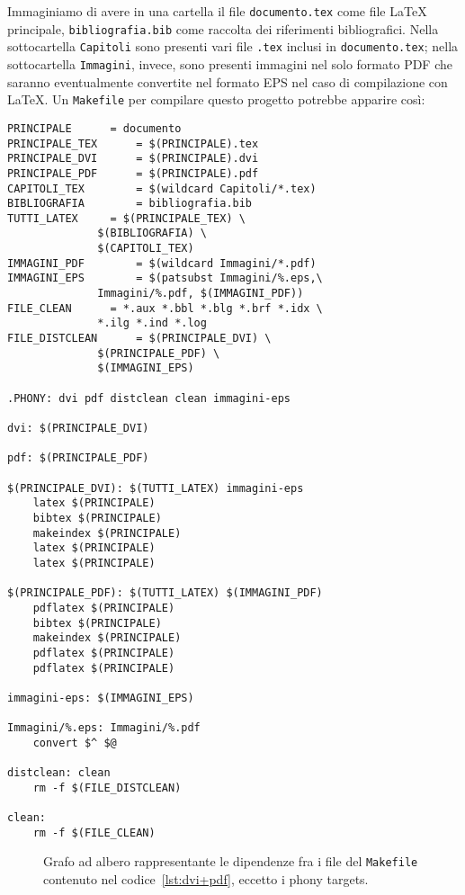 Immaginiamo di avere in una cartella il file \texttt{documento.tex} come file
\LaTeX{}
principale, \texttt{bibliografia.bib} come raccolta dei riferimenti
bibliografici.  Nella sottocartella \texttt{Capitoli} sono presenti vari file
\texttt{.tex} inclusi in \texttt{documento.tex}; nella sottocartella
\texttt{Immagini}, invece, sono presenti immagini nel solo formato \textsc{PDF}
che saranno eventualmente convertite nel formato \textsc{EPS} nel caso di
compilazione con \LaTeX.  Un \texttt{Makefile} per compilare questo progetto
potrebbe apparire così:
\begin{lstlisting}[caption={\texttt{Makefile} in cui la prima regola compila il
documento in \textsc{DVI} convertendo le immagini \textsc{PDF} in \textsc{EPS},
la seconda regola compila in formato \textsc{PDF}.},
label=lst:dvi+pdf]
PRINCIPALE 		= documento
PRINCIPALE_TEX		= $(PRINCIPALE).tex
PRINCIPALE_DVI		= $(PRINCIPALE).dvi
PRINCIPALE_PDF		= $(PRINCIPALE).pdf
CAPITOLI_TEX		= $(wildcard Capitoli/*.tex)
BIBLIOGRAFIA		= bibliografia.bib
TUTTI_LATEX		= $(PRINCIPALE_TEX) \
			  $(BIBLIOGRAFIA) \
			  $(CAPITOLI_TEX)
IMMAGINI_PDF		= $(wildcard Immagini/*.pdf)
IMMAGINI_EPS		= $(patsubst Immagini/%.eps,\
			  Immagini/%.pdf, $(IMMAGINI_PDF))
FILE_CLEAN		= *.aux *.bbl *.blg *.brf *.idx \
			  *.ilg *.ind *.log
FILE_DISTCLEAN		= $(PRINCIPALE_DVI) \
			  $(PRINCIPALE_PDF) \
			  $(IMMAGINI_EPS)

.PHONY: dvi pdf distclean clean immagini-eps

dvi: $(PRINCIPALE_DVI)

pdf: $(PRINCIPALE_PDF)

$(PRINCIPALE_DVI): $(TUTTI_LATEX) immagini-eps
	latex $(PRINCIPALE)
	bibtex $(PRINCIPALE)
	makeindex $(PRINCIPALE)
	latex $(PRINCIPALE)
	latex $(PRINCIPALE)

$(PRINCIPALE_PDF): $(TUTTI_LATEX) $(IMMAGINI_PDF)
	pdflatex $(PRINCIPALE)
	bibtex $(PRINCIPALE)
	makeindex $(PRINCIPALE)
	pdflatex $(PRINCIPALE)
	pdflatex $(PRINCIPALE)

immagini-eps: $(IMMAGINI_EPS)

Immagini/%.eps: Immagini/%.pdf
	convert $^ $@

distclean: clean
	rm -f $(FILE_DISTCLEAN)

clean:
	rm -f $(FILE_CLEAN)
\end{lstlisting}
\begin{figure}
  \centering
  \caption{Grafo ad albero rappresentante le dipendenze fra i file del
    \texttt{Makefile} contenuto nel codice~\ref{lst:dvi+pdf}, eccetto i phony
    targets.}
  \label{fig:grafo-albero2}
\end{figure}
